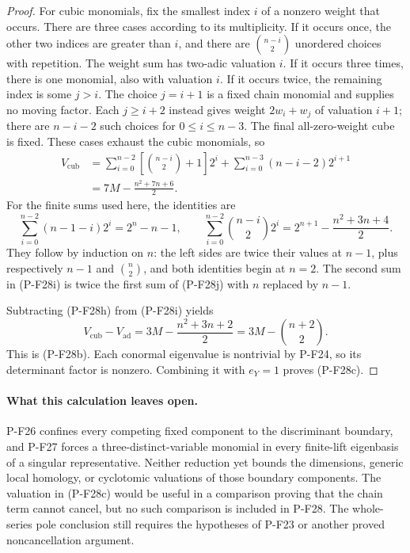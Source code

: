\begin{proof}
For cubic monomials, fix the smallest index $i$
of a nonzero weight that occurs. There are three
cases according to its multiplicity. If it occurs
once, the other two indices are greater than $i$,
and there are $\binom{n-i}{2}$ unordered choices
with repetition. The weight sum has two-adic
valuation $i$. If it occurs three times, there is
one monomial, also with valuation $i$.
If it occurs twice, the remaining index is some
$j>i$. The choice $j=i+1$ is a fixed chain
monomial and supplies no moving factor. Each
$j\ge i+2$ instead gives weight $2w_i+w_j$ of
valuation $i+1$; there are $n-i-2$ such choices
for $0\le i\le n-3$. The final all-zero-weight
cube is fixed. These cases exhaust the cubic
monomials, so
\begin{align*}
 V_{\mathrm{cub}}
 &=\sum_{i=0}^{n-2}
        \left[\binom{n-i}{2}+1\right]2^i
      +\sum_{i=0}^{n-3}(n-i-2)2^{i+1}\\
 &=7M-\frac{n^2+7n+6}{2}.
 \tag{P-F28i}
\end{align*}
For the finite sums used here, the identities are
\[
 \sum_{i=0}^{n-2}(n-1-i)2^i=2^n-n-1,\qquad
 \sum_{i=0}^{n-2}\binom{n-i}{2}2^i
    =2^{n+1}-\frac{n^2+3n+4}{2}.
 \tag{P-F28j}
\]
They follow by induction on $n$: the left sides
are twice their values at $n-1$, plus respectively
$n-1$ and $\binom n2$, and both identities begin
at $n=2$. The second sum in (P-F28i) is twice the
first sum of (P-F28j) with $n$ replaced by $n-1$.

Subtracting (P-F28h) from (P-F28i) yields
\[
 V_{\mathrm{cub}}-V_{\mathrm{ad}}
     =3M-\frac{n^2+3n+2}{2}
     =3M-\binom{n+2}{2}.
 \tag{P-F28k}
\]
This is (P-F28b). Each conormal eigenvalue is
nontrivial by P-F24, so its determinant factor
is nonzero. Combining it with $e_Y=1$ proves
(P-F28c).
\end{proof}

\paragraph{What this calculation leaves open.}
P-F26 confines every competing fixed component to
the discriminant boundary, and P-F27 forces a
three-distinct-variable monomial in every finite-lift
eigenbasis of a singular representative.
Neither reduction yet bounds the dimensions,
generic local homology, or cyclotomic valuations
of those boundary components. The valuation in
(P-F28c) would be useful in a comparison proving
that the chain term cannot cancel, but no such
comparison is included in P-F28. The whole-series
pole conclusion still requires the hypotheses of
P-F23 or another proved noncancellation argument.

